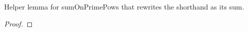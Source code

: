 \begin{theorem}
\label{sumOnPrimePows_apply}
\leanok
Helper lemma for sumOnPrimePows that rewrites the shorthand as its sum.
\end{theorem}
\begin{proof}
\leanok
\end{proof}
